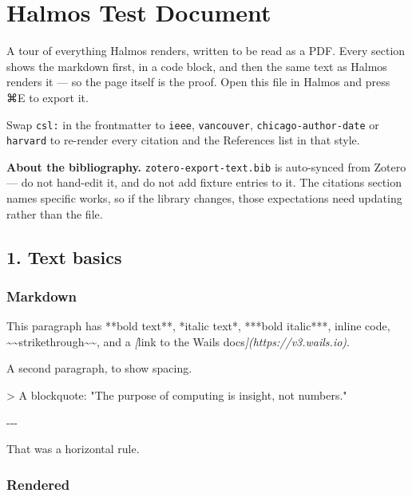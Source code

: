 \documentclass[
]{article}
\author{}
\date{}
\newenvironment{Shaded}{}{}
\newcommand{\AttributeTok}[1]{\textcolor[rgb]{0.49,0.56,0.16}{#1}}
\newcommand{\CommentTok}[1]{\textcolor[rgb]{0.38,0.63,0.69}{\textit{#1}}}
\newcommand{\NormalTok}[1]{#1}
\newcommand{\OtherTok}[1]{\textcolor[rgb]{0.00,0.44,0.13}{#1}}
\begin{document}
\section{Halmos Test Document}\label{halmos-test-document}

A tour of everything Halmos renders, written to be read as a PDF. Every
section shows the markdown first, in a code block, and then the same
text as Halmos renders it --- so the page itself is the proof. Open this
file in Halmos and press ⌘E to export it.

Swap \texttt{csl:} in the frontmatter to \texttt{ieee},
\texttt{vancouver}, \texttt{chicago-author-date} or \texttt{harvard} to
re-render every citation and the References list in that style.

\textbf{About the bibliography.} \texttt{zotero-export-text.bib} is
auto-synced from Zotero --- do not hand-edit it, and do not add fixture
entries to it. The citations section names specific works, so if the
library changes, those expectations need updating rather than the file.

\subsection{1. Text basics}\label{text-basics}

\subsubsection{Markdown}\label{markdown}

\begin{Shaded}
\begin{Highlighting}[]
\NormalTok{This paragraph has **bold text**, *italic text*, ***bold italic***, \textasciigrave{}inline}
\NormalTok{code\textasciigrave{}, \textasciitilde{}\textasciitilde{}strikethrough\textasciitilde{}\textasciitilde{}, and a }\CommentTok{[}\OtherTok{link to the Wails docs}\CommentTok{](https://v3.wails.io)}\NormalTok{.}

\NormalTok{A second paragraph, to show spacing.}

\AttributeTok{\textgreater{} A blockquote: "The purpose of computing is insight, not numbers."}

\NormalTok{{-}{-}{-}}

\NormalTok{That was a horizontal rule.}
\end{Highlighting}
\end{Shaded}

\subsubsection{Rendered}\label{rendered}
\end{document}
